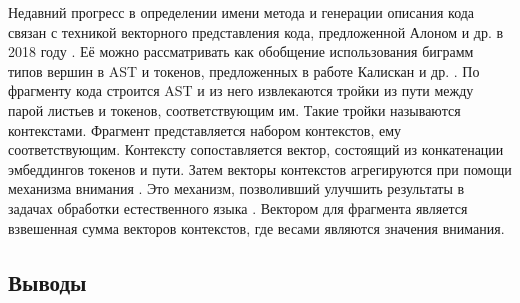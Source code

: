 Недавний прогресс в определении имени метода и генерации описания кода связан с техникой векторного представления кода, предложенной Алоном и др. в 2018 году \cite{Alon2018, Alon2019}. Её можно рассматривать как обобщение использования биграмм типов вершин в AST и токенов, предложенных в работе Калискан и др. \cite{Caliskan2015}. По фрагменту кода строится AST и из него извлекаются тройки из пути между парой листьев и токенов, соответствующим им. Такие тройки называются контекстами. Фрагмент представляется набором контекстов, ему соответствующим. Контексту сопоставляется вектор, состоящий из конкатенации эмбеддингов токенов и пути. Затем векторы контекстов агрегируются при помощи механизма внимания \cite{attention}. Это механизм, позволивший улучшить результаты в задачах обработки естественного языка \cite{Young2018}. Вектором для фрагмента является взвешенная сумма векторов контекстов, где весами являются значения внимания.

\subsection{Выводы}

